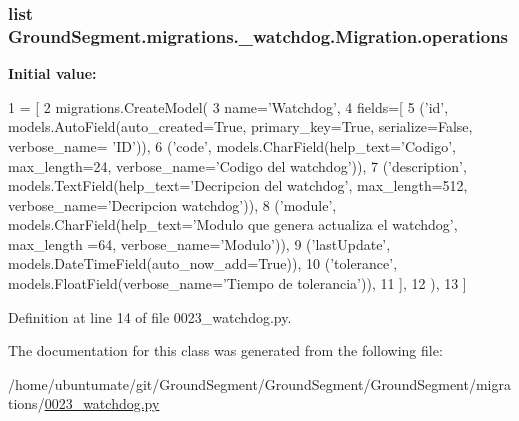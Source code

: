 \hypertarget{class_ground_segment_1_1migrations_1_10023__watchdog_1_1_migration_aedbaf5f24fd223907b71a2784f5302e3}{}
\subsubsection[{operations}]{\setlength{\rightskip}{0pt plus 5cm}list Ground\+Segment.\+migrations.\+\_\+watchdog.\+Migration.\+operations\hspace{0.3cm}{\ttfamily [static]}}\label{class_ground_segment_1_1migrations_1_10023__watchdog_1_1_migration_aedbaf5f24fd223907b71a2784f5302e3}
{\bfseries Initial value\+:}
\begin{DoxyCode}
1 = [
2         migrations.CreateModel(
3             name=\textcolor{stringliteral}{'Watchdog'},
4             fields=[
5                 (\textcolor{stringliteral}{'id'}, models.AutoField(auto\_created=\textcolor{keyword}{True}, primary\_key=\textcolor{keyword}{True}, serialize=\textcolor{keyword}{False}, verbose\_name=\textcolor{stringliteral}{
      'ID'})),
6                 (\textcolor{stringliteral}{'code'}, models.CharField(help\_text=\textcolor{stringliteral}{'Codigo'}, max\_length=24, verbose\_name=\textcolor{stringliteral}{'Codigo del
       watchdog'})),
7                 (\textcolor{stringliteral}{'description'}, models.TextField(help\_text=\textcolor{stringliteral}{'Decripcion del watchdog'}, max\_length=512, 
      verbose\_name=\textcolor{stringliteral}{'Decripcion watchdog'})),
8                 (\textcolor{stringliteral}{'module'}, models.CharField(help\_text=\textcolor{stringliteral}{'Modulo que genera actualiza el watchdog'}, max\_length
      =64, verbose\_name=\textcolor{stringliteral}{'Modulo'})),
9                 (\textcolor{stringliteral}{'lastUpdate'}, models.DateTimeField(auto\_now\_add=\textcolor{keyword}{True})),
10                 (\textcolor{stringliteral}{'tolerance'}, models.FloatField(verbose\_name=\textcolor{stringliteral}{'Tiempo de tolerancia'})),
11             ],
12         ),
13     ]
\end{DoxyCode}


Definition at line 14 of file 0023\+\_\+watchdog.\+py.



The documentation for this class was generated from the following file\+:\begin{DoxyCompactItemize}
\item 
/home/ubuntumate/git/\+Ground\+Segment/\+Ground\+Segment/\+Ground\+Segment/migrations/\hyperlink{0023__watchdog_8py}{0023\+\_\+watchdog.\+py}\end{DoxyCompactItemize}
